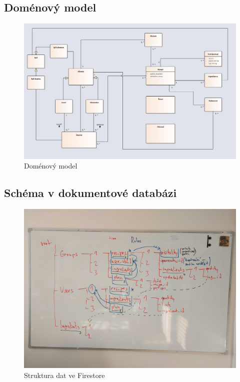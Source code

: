 \subsection{Doménový model}
\begin{figure}[h]
    \includegraphics[width=\textwidth]{images/domain-model}
    \caption{Doménový model} \label{picture:recipeo:domain-model}
\end{figure}

\subsection{Schéma v dokumentové databázi}
\begin{figure}[H]
    \includegraphics[width=\textwidth]{images/firestore-structure}
    \caption{Struktura dat ve Firestore} \label{picture:recipeo:firestore-structure}
\end{figure}

